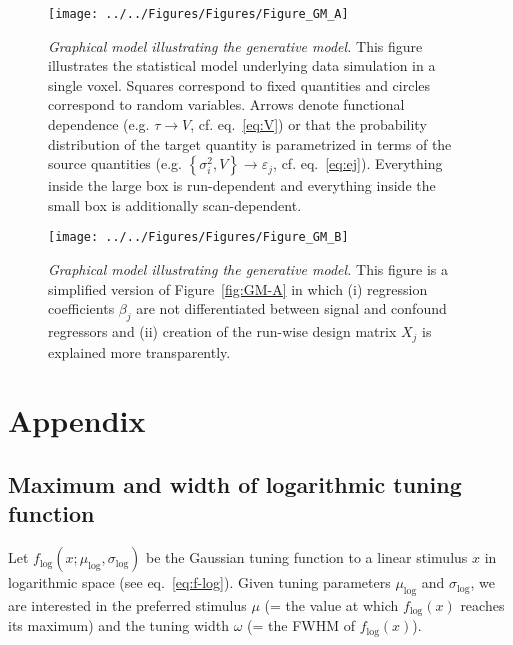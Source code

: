 \documentclass[a4paper,12pt]{article}
\begin{document}
\begin{figure}
	\begin{center}
		\texttt{[image: ../../Figures/Figures/Figure\_GM\_A]}
	\end{center}
	\vspace{-1em}
	\caption{\textit{Graphical model illustrating the generative model.} This figure illustrates the statistical model underlying data simulation in a single voxel. Squares correspond to fixed quantities and circles correspond to random variables. Arrows denote functional dependence (e.g. $\tau \rightarrow V$, cf. eq.~\ref{eq:V}) or that the probability distribution of the target quantity is parametrized in terms of the source quantities (e.g. $\left\lbrace \sigma_i^2, V \right\rbrace \rightarrow \varepsilon_j$, cf. eq.~\ref{eq:ej}). Everything inside the large box is run-dependent and everything inside the small box is additionally scan-dependent.} \label{fig:GM-A}
	\begin{center}
		\texttt{[image: ../../Figures/Figures/Figure\_GM\_B]}
	\end{center}
	\vspace{-1em}
	\caption{\textit{Graphical model illustrating the generative model.} This figure is a simplified version of Figure~\ref{fig:GM-A} in which (i) regression coefficients $\beta_j$ are not differentiated between signal and confound regressors and (ii) creation of the run-wise design matrix $X_j$ is explained more transparently.} \label{fig:GM-B}
\end{figure}


\pagebreak
\section{Appendix} \label{sec:Appendix}
\renewcommand\thesubsection{\Alph{subsection}}
\renewcommand\theequation{\thesubsection.\arabic{equation}}

\setcounter{equation}{0}
\subsection{Maximum and width of logarithmic tuning function} \label{sec:App-A}

Let $f_\mathrm{log}(x; \mu_\mathrm{log}, \sigma_\mathrm{log})$ be the Gaussian tuning function to a linear stimulus $x$ in logarithmic space (see eq.~\ref{eq:f-log}). Given tuning parameters $\mu_\mathrm{log}$ and $\sigma_\mathrm{log}$, we are interested in the preferred stimulus $\mu$ (= the value at which $f_\mathrm{log}(x)$ reaches its maximum) and the tuning width $\omega$ (= the FWHM of  $f_\mathrm{log}(x)$).
\end{document}
